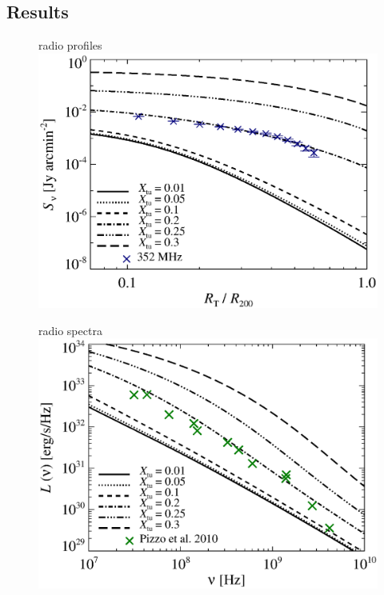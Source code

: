 \documentclass[fleqn,usenatbib,useAMS]{mnras}
\begin{document}
\subsection{Results}

\begin{figure}
\begin{minipage}{1\columnwidth}
   \begin{center}\Large{radio profiles}\\
     \includegraphics[width=\columnwidth]{prof.comp.KrTTDth.Xtu.eps}
   \end{center}
\end{minipage}
\begin{minipage}{1\columnwidth}
   \begin{center}\Large{radio spectra}\\
     \includegraphics[width=\columnwidth]{spec.comp.KrTTDth.Xtu.eps}

\end{center}
\end{minipage}
\end{figure}
\end{document}

